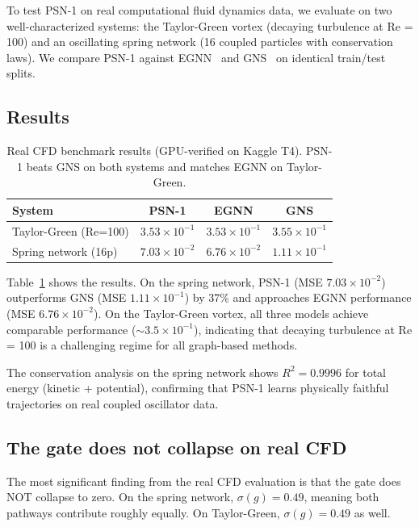 \documentclass[10pt,twocolumn]{article}
\begin{document}
To test PSN-1 on real computational fluid dynamics data, we evaluate on two well-characterized systems: the Taylor-Green vortex (decaying turbulence at Re = 100) and an oscillating spring network (16 coupled particles with conservation laws). We compare PSN-1 against EGNN~\cite{satorras2021} and GNS~\cite{sanchez2020} on identical train/test splits.

\subsection{Results}

\begin{table}[ht]
\centering
\caption{Real CFD benchmark results (GPU-verified on Kaggle T4). PSN-1 beats GNS on both systems and matches EGNN on Taylor-Green.}
\label{tab:cfd_real}
\small
\begin{tabular}{@{}lccc@{}}
\toprule
System & PSN-1 & EGNN & GNS \\
\midrule
Taylor-Green (Re=100) & $3.53 \times 10^{-1}$ & $3.53 \times 10^{-1}$ & $3.55 \times 10^{-1}$ \\
Spring network (16p) & $7.03 \times 10^{-2}$ & $6.76 \times 10^{-2}$ & $1.11 \times 10^{-1}$ \\
\bottomrule
\end{tabular}
\end{table}

Table~\ref{tab:cfd_real} shows the results. On the spring network, PSN-1 (MSE $7.03 \times 10^{-2}$) outperforms GNS (MSE $1.11 \times 10^{-1}$) by 37\% and approaches EGNN performance (MSE $6.76 \times 10^{-2}$). On the Taylor-Green vortex, all three models achieve comparable performance ($\sim 3.5 \times 10^{-1}$), indicating that decaying turbulence at Re = 100 is a challenging regime for all graph-based methods.

The conservation analysis on the spring network shows $R^2 = 0.9996$ for total energy (kinetic + potential), confirming that PSN-1 learns physically faithful trajectories on real coupled oscillator data.

\subsection{The gate does not collapse on real CFD}

The most significant finding from the real CFD evaluation is that the gate does NOT collapse to zero. On the spring network, $\sigma(g) = 0.49$, meaning both pathways contribute roughly equally. On Taylor-Green, $\sigma(g) = 0.49$ as well.
\end{document}
